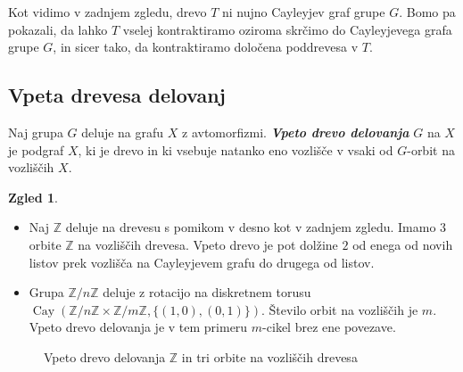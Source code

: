 \documentclass[11pt]{book}
\def\ZZ{\mathbb{Z}}
\DeclareMathOperator\Cay{Cay}
\def\definicija{\color{rdeca}\bf\em}
\theoremstyle{definition}
\theoremstyle{zgled}
\newtheorem*{zgled}{Zgled}
\theoremstyle{odprtproblem}
\theoremstyle{domacanaloga}
\theoremstyle{izrek}
\begin{document}
Kot vidimo v zadnjem zgledu, drevo $T$ ni nujno Cayleyjev graf grupe $G$. Bomo pa pokazali, da lahko $T$ vselej kontraktiramo oziroma skrčimo do Cayleyjevega grafa grupe $G$, in sicer tako, da kontraktiramo določena poddrevesa v $T$.

\subsection{Vpeta drevesa delovanj}

Naj grupa $G$ deluje na grafu $X$ z avtomorfizmi. {\definicija Vpeto drevo delovanja} $G$ na $X$ je podgraf $X$, ki je drevo in ki vsebuje natanko eno vozlišče v vsaki od $G$-orbit na vozliščih $X$.

\begin{zgled}
\begin{itemize}
    \item Naj $\ZZ$ deluje na drevesu s pomikom v desno kot v zadnjem zgledu. Imamo $3$ orbite $\ZZ$ na vozliščih drevesa. Vpeto drevo je pot dolžine $2$ od enega od novih listov prek vozlišča na Cayleyjevem grafu do drugega od listov.
    
    \item Grupa $\ZZ/n\ZZ$ deluje z rotacijo na diskretnem torusu $\Cay(\ZZ/n\ZZ \times \ZZ/m\ZZ, \{ (1,0), (0,1) \})$. Število orbit na vozliščih je $m$. Vpeto drevo delovanja je v tem primeru $m$-cikel brez ene povezave.
\end{itemize}
\end{zgled}

\begin{figure}[t]
\centering
{}
\caption{Vpeto drevo delovanja $\ZZ$ in tri orbite na vozliščih drevesa}
\end{figure}
\end{document}
